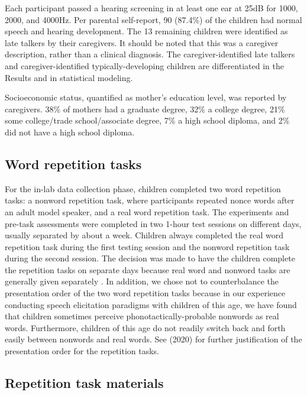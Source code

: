\documentclass[a4paper,man,natbib,donotrepeattitle, apacite]{apa6}
\begin{document}
Each participant passed a hearing screening in at least one ear at 25dB for 1000, 2000, and 4000Hz. Per parental self-report, 90 (87.4\%) of the children had normal speech and hearing development. The 13 remaining children were identified as late talkers by their caregivers. It should be noted that this was a caregiver description, rather than a clinical diagnosis. The caregiver-identified late talkers and caregiver-identified typically-developing children are differentiated in the Results and in statistical modeling. 

Socioeconomic status, quantified as mother’s education level, was reported by caregivers. 38\% of mothers had a graduate degree, 32\% a college degree, 21\% some college/trade school/associate degree, 7\% a high school diploma, and 2\% did not have a high school diploma. 

\subsection{Word repetition tasks}

For the in-lab data collection phase, children completed two word repetition tasks: a nonword repetition task, where participants repeated nonce words after an adult model speaker, and a real word repetition task. The experiments and pre-task assessments were completed in two 1-hour test sessions on different days, usually separated by about a week. Children always completed the real word repetition task during the first testing session and the nonword repetition task during the second session. The decision was made to have the children complete the repetition tasks on separate days because real word and nonword tasks are generally given separately \cite{chiatPreschoolRepetitionTest2007}. In addition, we chose not to counterbalance the presentation order of the two word repetition tasks because in our experience conducting speech elicitation paradigms with children of this age, we have found that children sometimes perceive phonotactically-probable nonwords as real words. Furthermore, children of this age do not readily switch back and forth easily between nonwords and real words. See \citeauthor{cychoszLexicalAdvantageFouryearold2020}(2020) for further justification of the presentation order for the repetition tasks. 

\subsection{Repetition task materials}
\end{document}
